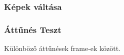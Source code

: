 \documentclass[12pt, aspectratio=169]{beamer}
\begin{document}
\begin{frame}
    \frametitle{Képek váltása}
\end{frame}

\begin{frame}
    \frametitle{Áttűnés Teszt}
    Különböző áttűnések frame-ek között.
\end{frame}
\end{document}
